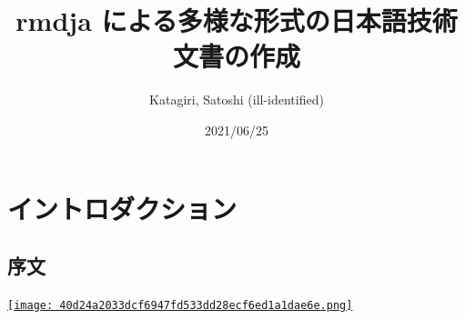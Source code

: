 \documentclass[
  xelatex,ja=standard,jafont=noto]{bxjsbook}
\title{\textbf{rmdja} による多様な形式の日本語技術文書の作成}
\author{Katagiri, Satoshi (ill-identified)}
\date{2021/06/25}
\theoremstyle{definition}
\theoremstyle{definition}
\theoremstyle{definition}
\theoremstyle{definition}
\theoremstyle{remark}
\begin{document}
\maketitle

{
\hypersetup{linkcolor=}
\setcounter{tocdepth}{2}
\tableofcontents
}
\hypertarget{part-ux30a4ux30f3ux30c8ux30edux30c0ux30afux30b7ux30e7ux30f3}{%
\part{
イントロダクション}\label{part-ux30a4ux30f3ux30c8ux30edux30c0ux30afux30b7ux30e7ux30f3}}

\hypertarget{ux5e8fux6587}{%
\chapter*{序文}\label{ux5e8fux6587}}

\href{https://creativecommons.org/licenses/by-nc/4.0/deed.ja}{\texttt{[image: 40d24a2033dcf6947fd533dd28ecf6ed1a1dae6e.png]}}
\end{document}
